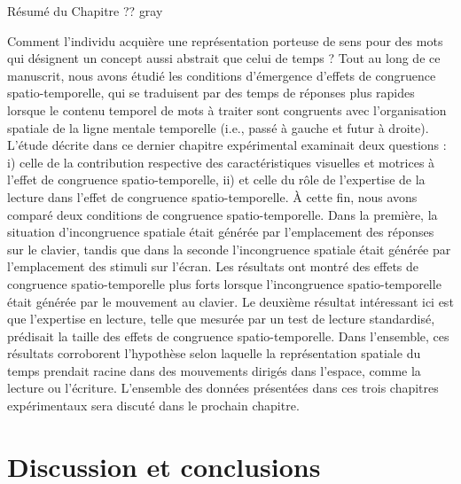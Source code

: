 \documentclass[
  a4paper,12pt,twoside,onecolumn,openright,final,oldfontcommands]{memoir}
\newcommand\chaptercolor{gray}
\newcommand{\changechaptercolor}[1]{
  \renewcommand\chaptercolor{#1}
}
\newcommand\getcurrentref[1]{
 \ifnumequal{\value{#1}}{0}
  {??}
  {\the\value{#1}}
}
\begin{document}
\begin{vplace}[1]

\begin{summary}{Résumé du Chapitre\getcurrentref{chapter}}{\chaptercolor}

Comment l’individu acquière une représentation porteuse de sens pour des mots qui désignent un concept aussi abstrait que celui de temps ? Tout au long de ce manuscrit, nous avons étudié les conditions d'émergence d’effets de congruence spatio-temporelle, qui se traduisent par des temps de réponses plus rapides lorsque le contenu temporel de mots à traiter sont congruents avec l'organisation spatiale de la ligne mentale temporelle (i.e., passé à gauche et futur à droite). L’étude décrite dans ce dernier chapitre expérimental examinait deux questions : i) celle de la contribution respective des caractéristiques visuelles et motrices à l'effet de congruence spatio-temporelle, ii) et celle du rôle de l'expertise de la lecture dans l'effet de congruence spatio-temporelle. À cette fin, nous avons comparé deux conditions de congruence spatio-temporelle. Dans la première, la situation d’incongruence spatiale était générée par l'emplacement des réponses sur le clavier, tandis que dans la seconde l'incongruence spatiale était générée par l'emplacement des stimuli sur l'écran. Les résultats ont montré des effets de congruence spatio-temporelle plus forts lorsque l’incongruence spatio-temporelle était générée par le mouvement au clavier. Le deuxième résultat intéressant ici est que l'expertise en lecture, telle que mesurée par un test de lecture standardisé, prédisait la taille des effets de congruence spatio-temporelle. Dans l'ensemble, ces résultats corroborent l’hypothèse selon laquelle la représentation spatiale du temps prendait racine dans des mouvements dirigés dans l'espace, comme la lecture ou l'écriture. L’ensemble des données présentées dans ces trois chapitres expérimentaux sera discuté dans le prochain chapitre.  

\end{summary}

\end{vplace}

\hypertarget{part-discussion-et-conclusions}{%
\part{Discussion et conclusions}\label{part-discussion-et-conclusions}}

\changechaptercolor{hokusai6}
\end{document}
